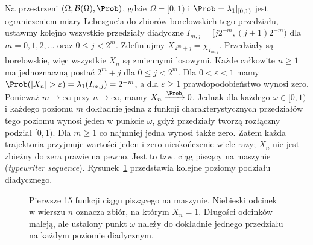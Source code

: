 \begin{przyklad}
Na przestrzeni $(\Omega,\mathcal B(\Omega),\Prob)$,
gdzie $\Omega=[0,1)$ i $\Prob=\lambda_1|_{[0,1)}$
jest ograniczeniem miary Lebesgue'a do zbiorów
borelowskich tego przedziału, ustawmy kolejno
wszystkie przedziały diadyczne
$I_{m,j}=[j2^{-m},(j+1)2^{-m})$ dla
$m=0,1,2,\ldots$ oraz $0\leq j<2^m$.
Zdefiniujmy $X_{2^m+j}=\chi_{I_{m,j}}$.
Przedziały są borelowskie, więc wszystkie $X_n$
są zmiennymi losowymi. Każde całkowite $n\geq1$
ma jednoznaczną postać $2^m+j$ dla $0\leq j<2^m$.
Dla $0<\varepsilon<1$ mamy
$\Prob(|X_n|>\varepsilon)=\lambda_1(I_{m,j})=2^{-m}$,
a dla $\varepsilon\geq1$ prawdopodobieństwo wynosi zero.
Ponieważ $m\to\infty$ przy $n\to\infty$, mamy
$X_n\xrightarrow{\Prob}0$. Jednak dla każdego
$\omega\in[0,1)$ i każdego poziomu $m$ dokładnie
jedna z funkcji charakterystycznych przedziałów
tego poziomu wynosi jeden w punkcie $\omega$,
gdyż przedziały tworzą rozłączny podział $[0,1)$.
Dla $m\geq1$ co najmniej jedna wynosi także zero.
Zatem każda trajektoria przyjmuje wartości jeden i zero
nieskończenie wiele razy; $X_n$ nie jest zbieżny do zera
prawie na pewno. Jest to tzw. ciąg piszący na maszynie
(\emph{typewriter sequence}).
Rysunek~\ref{fig:rp1-07-typewriter} przedstawia kolejne poziomy podziału diadycznego.
\end{przyklad}

\begin{figure}[htbp]
\centering
{}
\caption{Pierwsze 15 funkcji ciągu piszącego na maszynie.
Niebieski odcinek w wierszu $n$ oznacza zbiór,
na którym $X_n=1$. Długości odcinków maleją,
ale ustalony punkt $\omega$ należy do dokładnie
jednego przedziału na każdym poziomie diadycznym.}
\label{fig:rp1-07-typewriter}
\end{figure}


